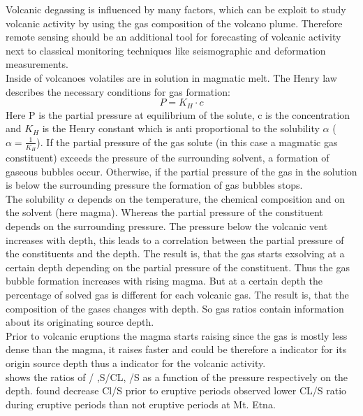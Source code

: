 \documentclass  [
  paper    = a4,
  BCOR     = 10mm,
  twoside,
  fontsize = 12pt,
  fleqn,
  toc      = bibnumbered,
  toc      = listofnumbered,
  numbers  = noendperiod,
  headings = normal,
  listof   = leveldown,
  version  = 3.03
]                                       {scrreprt}
\begin{document}
	Volcanic degassing is influenced by many factors, which can be exploit to study volcanic activity by using the gas composition of the volcano plume. Therefore remote sensing should be an additional tool for forecasting of volcanic activity next to classical monitoring techniques like seismographic and deformation measurements.\\
	Inside of volcanoes volatiles are in solution in magmatic melt. The Henry law  describes the necessary conditions for gas formation:
	\begin{equation}
	P = K_{H}\cdot c
	\label{Henrylaw}
	\end{equation}
	Here P is the partial pressure at equilibrium of the solute, c is the concentration and $ K_{H}$ is the Henry constant which is anti proportional to the solubility $\alpha$ ($\alpha = \frac{1}{ K_{H}}$).
	If the partial pressure of the gas solute (in this case a magmatic gas constituent) exceeds the pressure of the surrounding solvent, a formation of gaseous bubbles occur. Otherwise, if the partial pressure of the gas in the solution is below the surrounding pressure the formation of gas bubbles stops.\\
	The solubility $\alpha$ depends on the temperature, the chemical composition and on the solvent (here magma). Whereas the partial pressure of the constituent depends on the surrounding pressure. The pressure below the volcanic vent increases with depth, this leads to a correlation between the partial pressure of the constituents and the depth.
	The result is, that the gas starts exsolving at a certain depth depending on the  partial pressure of the constituent. Thus the gas bubble formation increases with rising magma. But at a certain depth the percentage of solved gas is different for each volcanic gas. The result is, that the composition of the gases changes with depth. So gas ratios contain information about its originating source depth.\\
	Prior to volcanic eruptions the magma starts raising since the gas is mostly less dense than the magma, it raises faster and could be therefore a indicator for its origin source depth thus a indicator for the volcanic activity.\\
	 shows the ratios of   / ,S/CL, /S as a function of the pressure respectively on the depth.
	\citet{noguchi1963prediction} found decrease Cl/S prior to eruptive periods
	\citet{pennisi1998variations} observed lower CL/S ratio during eruptive periods than not eruptive periods at Mt. Etna.
\end{document}
